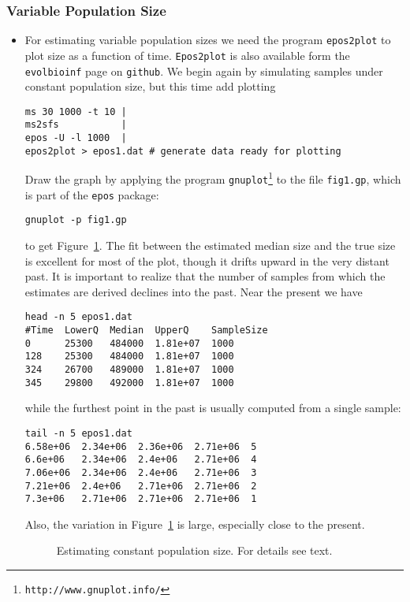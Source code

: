 \documentclass[a4paper]{article}
\newcommand{\ty}{\texttt}
\begin{document}
\subsubsection{Variable Population Size}
\begin{itemize}
  \item For estimating variable population sizes we need the program \ty{epos2plot} to
    plot size as a function of time. \ty{Epos2plot} is also available form the \ty{evolbioinf} page
    on \ty{github}. We begin again by simulating samples under constant population
    size, but this time add plotting
\begin{verbatim}
ms 30 1000 -t 10 | 
ms2sfs           | 
epos -U -l 1000  | 
epos2plot > epos1.dat # generate data ready for plotting
\end{verbatim}
Draw the graph by applying the program
\ty{gnuplot}\footnote{\ty{http://www.gnuplot.info/}} to the file
\ty{fig1.gp}, which is part of the \ty{epos} package:
\begin{verbatim}
gnuplot -p fig1.gp
\end{verbatim}
to get Figure~\ref{fig:con}. The fit between the estimated median size
and the true size is excellent for most of the plot, though it drifts
upward in the very distant past. It is important to realize that the number of samples
from which the estimates are derived declines into the past. Near the
present we have
\begin{verbatim}
head -n 5 epos1.dat 
#Time  LowerQ  Median  UpperQ    SampleSize
0      25300   484000  1.81e+07  1000
128    25300   484000  1.81e+07	 1000
324    26700   489000  1.81e+07	 1000
345    29800   492000  1.81e+07	 1000
\end{verbatim}        
while the furthest point in the past is usually computed from a single
sample:
\begin{verbatim}
tail -n 5 epos1.dat 
6.58e+06  2.34e+06  2.36e+06  2.71e+06  5
6.6e+06   2.34e+06  2.4e+06   2.71e+06  4
7.06e+06  2.34e+06  2.4e+06   2.71e+06  3
7.21e+06  2.4e+06   2.71e+06  2.71e+06  2
7.3e+06   2.71e+06  2.71e+06  2.71e+06  1
\end{verbatim}
Also, the variation in Figure~\ref{fig:con} is
large, especially close to the present.
\begin{figure}
  \begin{center}
    \scalebox{0.6}{}
  \end{center}
  \caption{Estimating constant population size. For details see
  text.}\label{fig:con}
\end{figure}

\end{itemize}
\end{document}
